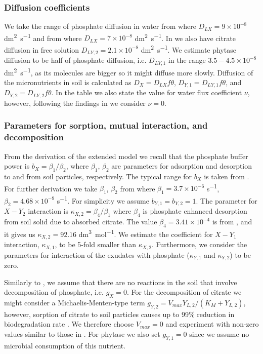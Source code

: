 \documentclass[11pt]{article}
\numberwithin{equation}{section}
\begin{document}
\subsubsection{Diffusion coefficients}
We take the range of phosphate diffusion in water from \cite{Ptashnyk-2010} where $D_{LX} = 9 \times 10^{-8}$ \si{dm^2 .s^{-1}} and from \cite{McKayFletcher-2019} where $D_{LX} = 7 \times 10^{-8}$ \si{dm^2.s^{-1}}. In \cite{McKayFletcher-2019} we also have citrate diffusion in free solution $D_{LY,2} = 2.1 \times 10^{-8}$ \si{dm^2.s^{-1}}. We estimate phytase diffusion to be half of phosphate diffusion, i.e. $D_{LY,1}$ in the range $3.5-4.5 \times 10^{-8}$ \si{dm^2.s^{-1}}, as its molecules are bigger so it might diffuse more slowly. Diffusion of the micronutrients in soil is calculated as $D_X = D_{LX} f \theta$, $D_{Y,1} = D_{LY,1} f \theta$, and $D_{Y,2} = D_{LY,2}f\theta$. In the table we also state the value for water flux coefficient $\nu$, however, following the findings in \cite{Ptashnyk-2011} we consider $\nu=0$. 

\subsubsection{Parameters for sorption, mutual interaction, and decomposition}
From the derivation of the extended model we recall that the phosphate buffer power is $b_X = \beta_1 / \beta_2$, where $\beta_1$, $\beta_2$ are parameters for adsorption and desorption to and from soil particles, respectively. The typical range for $b_X$ is taken from \cite{Ptashnyk-2010}. For further derivation we take $\beta_1$, $\beta_2$ from \cite{Ptashnyk-2010} where $\beta_1 = 3.7 \times 10^{-6}$ \si{s^{-1}}, $\beta_2 = 4.68 \times 10^{-9}$ \si{s^{-1}}. For simplicity we assume $b_{Y,1}=b_{Y,2} = 1$. The parameter for $X-Y_2$ interaction is $\kappa_{X,2} = \beta_4 / \beta_1$ where $\beta_4$ is phosphate enhanced desorption from soil solid due to absorbed citrate. The value $\beta_4 = 3.41 \times 10^{-4}$ is from \cite{McKayFletcher-2019}, and it gives us $\kappa_{X,2} = 92.16$ \si{dm^3. mol^{-1}}. We estimate the coefficient for $X-Y_1$ interaction, $\kappa_{X,1}$, to be 5-fold smaller than $\kappa_{X,2}$. Furthermore, we consider the parameters for interaction of the exudates with phosphate ($\kappa_{Y,1}$ and $\kappa_{Y,2}$) to be zero. 

Similarly to \cite{Ptashnyk-2011}, we assume that there are no reactions in the soil that involve decomposition of phosphate, i.e. $g_X = 0$. For the decomposition of citrate we might consider a Michaelis-Menten-type term $g_{Y,2} = V_{max} Y_{L,2} / (K_M + Y_{L,2})$, however, sorption of citrate to soil particles causes up to 99\% reduction in biodegradation rate \cite{McKayFletcher-2019}. We therefore choose $V_{max} = 0$ and experiment with non-zero values similar to those in \cite{Ptashnyk-2011}. For phytase we also set $g_{Y,1} = 0$ since we assume no microbial consumption of this nutrient.
\end{document}
